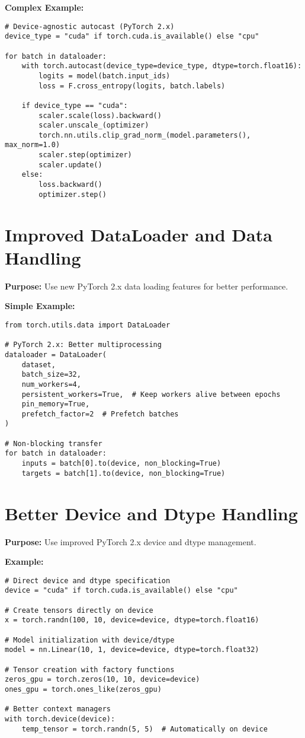 \documentclass[11pt,a4paper]{book}
\begin{document}
\textbf{Complex Example:}
\begin{verbatim}
# Device-agnostic autocast (PyTorch 2.x)
device_type = "cuda" if torch.cuda.is_available() else "cpu"

for batch in dataloader:
    with torch.autocast(device_type=device_type, dtype=torch.float16):
        logits = model(batch.input_ids)
        loss = F.cross_entropy(logits, batch.labels)
    
    if device_type == "cuda":
        scaler.scale(loss).backward()
        scaler.unscale_(optimizer)
        torch.nn.utils.clip_grad_norm_(model.parameters(), max_norm=1.0)
        scaler.step(optimizer)
        scaler.update()
    else:
        loss.backward()
        optimizer.step()
\end{verbatim}

\section{Improved DataLoader and Data Handling}

\textbf{Purpose:} Use new PyTorch 2.x data loading features for better performance.

\textbf{Simple Example:}
\begin{verbatim}
from torch.utils.data import DataLoader

# PyTorch 2.x: Better multiprocessing
dataloader = DataLoader(
    dataset,
    batch_size=32,
    num_workers=4,
    persistent_workers=True,  # Keep workers alive between epochs
    pin_memory=True,
    prefetch_factor=2  # Prefetch batches
)

# Non-blocking transfer
for batch in dataloader:
    inputs = batch[0].to(device, non_blocking=True)
    targets = batch[1].to(device, non_blocking=True)
\end{verbatim}

\section{Better Device and Dtype Handling}

\textbf{Purpose:} Use improved PyTorch 2.x device and dtype management.

\textbf{Example:}
\begin{verbatim}
# Direct device and dtype specification
device = "cuda" if torch.cuda.is_available() else "cpu"

# Create tensors directly on device
x = torch.randn(100, 10, device=device, dtype=torch.float16)

# Model initialization with device/dtype
model = nn.Linear(10, 1, device=device, dtype=torch.float32)

# Tensor creation with factory functions
zeros_gpu = torch.zeros(10, 10, device=device)
ones_gpu = torch.ones_like(zeros_gpu)

# Better context managers
with torch.device(device):
    temp_tensor = torch.randn(5, 5)  # Automatically on device
\end{verbatim}
\end{document}

